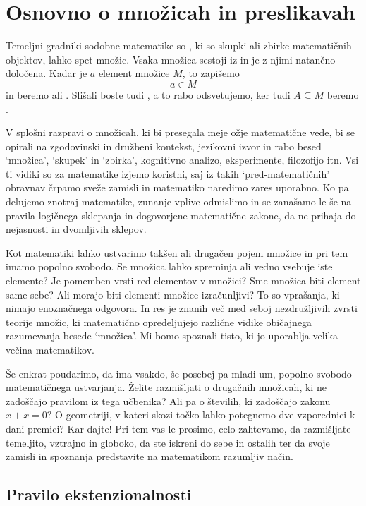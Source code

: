 \chapter{Osnovno o množicah in preslikavah}
\label{cha:mnozice-in-preslikave}


Temeljni gradniki sodobne matematike so , ki so skupki ali zbirke matematičnih
objektov, lahko spet množic. Vsaka množica sestoji iz  in je z njimi
natančno določena.
%
Kadar je $a$ element množice $M$, to zapišemo $$a \in M$$ in beremo  ali .
%
Slišali boste tudi , a to rabo odsvetujemo, ker tudi $A \subseteq M$ beremo .

V splošni razpravi o množicah, ki bi presegala meje ožje matematične vede, bi se opirali na
zgodovinski in družbeni kontekst, jezikovni izvor in rabo besed `množica', `skupek' in
`zbirka', kognitivno analizo, eksperimente, filozofijo itn. Vsi ti vidiki so za matematike
izjemo koristni, saj iz takih `pred-matematičnih' obravnav črpamo sveže zamisli in
matematiko naredimo zares uporabno. Ko pa delujemo znotraj matematike, zunanje vplive
odmislimo in se zanašamo le še na pravila logičnega sklepanja in dogovorjene matematične zakone, da ne
prihaja do nejasnosti in dvomljivih sklepov.

Kot matematiki lahko ustvarimo takšen ali drugačen pojem množice in pri tem imamo popolno
svobodo. Se množica lahko spreminja ali vedno vsebuje iste elemente? Je pomemben vrsti red
elementov v množici? Sme množica biti element same sebe? Ali morajo biti elementi množice
izračunljivi? To so vprašanja, ki nimajo enoznačnega odgovora. In res je znanih več med
seboj nezdružljivih zvrsti teorije množic, ki matematično opredeljujejo različne vidike
običajnega razumevanja besede `množica'. Mi bomo spoznali tisto, ki jo uporablja velika večina matematikov.

Še enkrat poudarimo, da ima vsakdo, še posebej pa mladi um, popolno svobodo matematičnega
ustvarjanja. Želite razmišljati o drugačnih množicah, ki ne zadoščajo pravilom iz tega učbenika?
Ali pa o številih, ki zadoščajo zakonu $x + x = 0$? O geometriji, v
kateri skozi točko lahko potegnemo dve vzporednici k dani premici? Kar dajte! Pri tem vas
le prosimo, celo zahtevamo, da razmišljate temeljito, vztrajno in globoko, da ste iskreni
do sebe in ostalih ter da svoje zamisli in spoznanja predstavite na matematikom razumljiv
način.


\section{Pravilo ekstenzionalnosti}
\label{sec:nacelo-ekstenzionalnosti}

